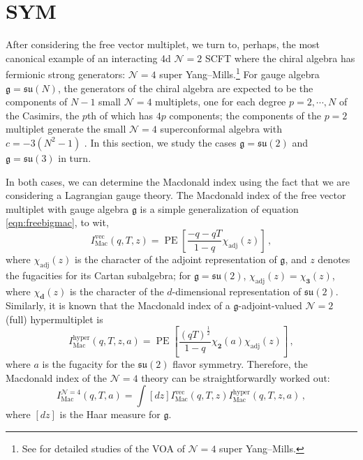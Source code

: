 \documentclass[12pt]{article}
\numberwithin{equation}{section}
\numberwithin{figure}{section}
\theoremstyle{plain}
\theoremstyle{definition}
\begin{document}
\section{\texorpdfstring{}{N=4} SYM}\label{sec:N4}

After considering the free vector multiplet, we turn to, perhaps, the most canonical example of an interacting 4d $\mathcal{N}=2$ SCFT where the chiral algebra has fermionic strong generators: $\mathcal{N}=4$ super Yang--Mills.\footnote{See \cite{Bonetti:2025kan,Gaberdiel:2025eaf} for detailed studies of the VOA of $\mathcal{N}=4$ super Yang--Mills.} For gauge algebra $\mathfrak{g} = \mathfrak{su}(N)$, the generators of the chiral algebra are expected to be the components of $N-1$ small $\mathcal{N}=4$ multiplets, one for each degree $p = 2, \cdots, N$ of the Casimirs, the $p$th of which has $4p$ components; the components of the $p = 2$ multiplet generate the small $\mathcal{N}=4$ superconformal algebra with $c = -3(N^2 - 1)$ \cite{Beem:2013sza}. In this section, we study the cases $\mathfrak{g} = \mathfrak{su}(2)$ and $\mathfrak{g} = \mathfrak{su}(3)$ in turn.

In both cases, we can determine the Macdonald index using the fact that we are considering a Lagrangian gauge theory. The Macdonald index of the free vector multiplet with gauge algebra $\mathfrak{g}$ is a simple generalization of equation \eqref{eqn:freebigmac}, to wit,
\begin{equation}
    I_\text{Mac}^{\text{vec}}(q, T, z) = \operatorname{PE} \left[ \frac{-q - qT}{1-q} \chi_{\text{adj}}(z) \right] \,,
\end{equation}
where $\chi_{\text{adj}}(z)$ is the character of the adjoint representation of $\mathfrak{g}$, and $z$ denotes the fugacities for its Cartan subalgebra; for $\mathfrak{g} = \mathfrak{su}(2)$, $\chi_\text{adj}(z) = \chi_{\bm{3}}(z)$, where $\chi_{\bm{d}}(z)$ is the character of the $d$-dimensional representation of $\mathfrak{su}(2)$. Similarly, it is known that the Macdonald index of a $\mathfrak{g}$-adjoint-valued $\mathcal{N}=2$ (full) hypermultiplet is
\begin{equation}\label{eqn:N4Mac}
    I_\text{Mac}^{\text{hyper}}(q, T, z, a) = \operatorname{PE} \left[ \frac{(q T)^{\frac{1}{2}}}{1-q} \chi_{\bm{2}}(a) \chi_{\text{adj}}(z) \right] \,,
\end{equation}
where $a$ is the fugacity for the $\mathfrak{su}(2)$ flavor symmetry. Therefore, the Macdonald index of the $\mathcal{N}=4$ theory can be straightforwardly worked out:
\begin{equation}\label{eqn:N4Macdonald}
    I_\text{Mac}^{\mathcal{N}=4}(q, T, a) = \int [dz] I_\text{Mac}^{\text{vec}}(q, T, z) I_\text{Mac}^{\text{hyper}}(q, T, z, a) \,,
\end{equation}
where $[dz]$ is the Haar measure for $\mathfrak{g}$.
\end{document}
